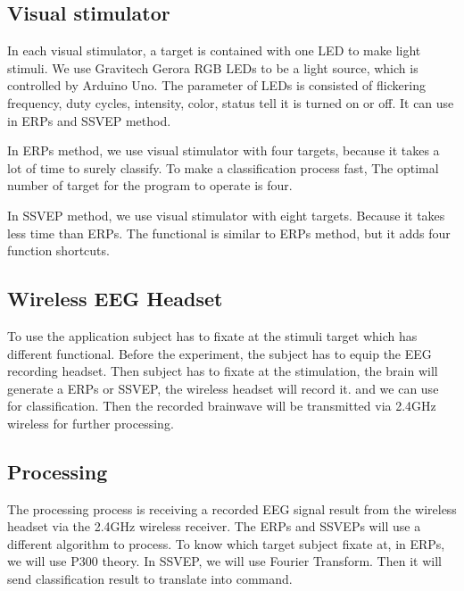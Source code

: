 \subsection{Visual stimulator}

\hspace{1.5cm}In each visual stimulator, a target is contained with one LED to make light stimuli. We use Gravitech Gerora RGB LEDs to be a light source, which is controlled by Arduino Uno.  The parameter of LEDs is consisted of flickering frequency, duty cycles, intensity, color, status tell it is turned on or off. It can use in ERPs and SSVEP method. 

In ERPs method, we use visual stimulator with four targets, because it takes a lot of time to surely classify. To make a classification process fast, The optimal number of target for the program to operate is four.

In SSVEP method, we use visual stimulator with eight targets. Because it takes less time than ERPs. The functional is similar to ERPs method, but it adds four function shortcuts.

\subsection{Wireless EEG Headset}
\hspace{1.5cm}To use the application subject has to fixate at the stimuli target which has different functional. Before the experiment, the subject has to equip the EEG recording headset. Then subject has to fixate at the stimulation, the brain will generate a ERPs or SSVEP, the wireless headset will record it. and we can use for classification. Then the recorded brainwave will be transmitted via 2.4GHz wireless for further processing.

\subsection{Processing}
\hspace{1.5cm}The processing process is receiving a recorded EEG signal result from the wireless headset via the 2.4GHz wireless receiver. The ERPs and SSVEPs will use a different algorithm to process. To know which target subject fixate at, in ERPs, we will use P300 theory. In SSVEP, we will use Fourier Transform. Then it will send classification result to translate into command.


